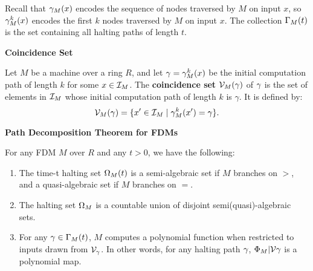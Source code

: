   Recall that $\gamma_M(x)$ encodes the sequence of nodes
  traversed by $M$ on input $x$, so $\gamma_M^k(x)$ encodes the
  first $k$ nodes traversed by $M$ on input $x$.  The collection
  $\Gamma_M(t)$ is the set containing all halting paths of length
  $t$.\\

  \begin{definition}{\textbf{Coincidence Set}}

    Let $M$ be a machine over a ring $R$, and let $\gamma =
    \gamma_M^k(x)$ be the initial computation path of length $k$
    for some $x \in \mathcal{I}_M$. The \textbf{coincidence set}
    $\mathcal{V}_M(\gamma)$ of $\gamma$ is the set of
    elements in $\mathcal{I}_M$ whose initial computation path of length
    $k$ is $\gamma$.  It is defined by:
    $$\mathcal{V}_M(\gamma) = 
    \{x' \in \mathcal{I}_M \mid \gamma_M^k(x') = \gamma\}.$$
  \end{definition}
    

  \begin{theorem}{\textbf{Path Decomposition Theorem for FDMs}}
    
    For any FDM $M$ over $R$ and any $t > 0$, we have the following:

    \begin{enumerate}
    \item The time-t halting set $\Omega_M(t)$ is a semi-algebraic
      set if $M$ branches on $>$, and a quasi-algebraic set if $M$
      branches on $=$.

    \item The halting set $\Omega_M$ is a countable union of
      disjoint semi(quasi)-algebraic sets.

    \item For any $\gamma \in \Gamma_M(t)$, $M$ computes a
      polynomial function when restricted to inputs drawn from
      $\mathcal{V}_\gamma$.  In other words, for any halting
      path $\gamma$, $\Phi_M|\mathcal{V}{\gamma}$
      is a polynomial map.
    \end{enumerate}
    
    \label{thm:pdt-finite}
  \end{theorem}

